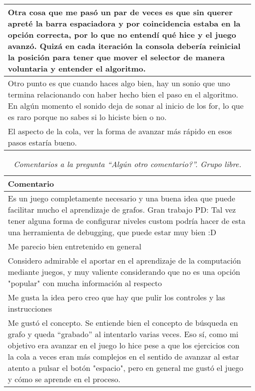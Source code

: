 \begin{table}[h]
\begin{tabular}{|p{\linewidth}|}
   Otra cosa que me pasó un par de veces es que sin querer apreté la barra espaciadora y por coincidencia estaba en la opción correcta, por lo que no entendí qué hice y el juego avanzó. Quizá en cada iteración la consola debería reinicial la posición para tener que mover el selector de manera voluntaria y entender el algoritmo. \\\hline
   
   Otro punto es que cuando haces algo bien, hay un sonio que uno termina relacionando con haber hecho bien el paso en el algoritmo. En algún momento el sonido deja de sonar al inicio de los for, lo que es raro porque no sabes si lo hiciste bien o no. \\\hline

   El aspecto de la cola, ver la forma de avanzar más rápido en esos pasos estaría bueno. \\
   \hline
   \end{tabular}
\end{table}

\restoregeometry



\begin{table}[h]
   \centering
   \caption*{\textit{Comentarios a la pregunta ``Algún otro comentario?''. Grupo libre.}}
   \begin{tabular}{|p{\linewidth}|}
   \hline %
   \textbf{Comentario} \\\hline
   Es un juego completamente necesario y una buena idea que puede facilitar mucho el aprendizaje de grafos. Gran trabajo
   PD: Tal vez tener alguna forma de configurar niveles custom podría hacer de esta una herramienta de debugging, que puede estar muy bien :D \\\hline
   Me parecio bien entretenido en general \\\hline
   
   Considero admirable el aportar en el aprendizaje de la computación mediante juegos, y muy valiente considerando que no es una opción "popular" con mucha información al respecto \\\hline
   Me gusta la idea pero creo que hay que pulir los controles y las instrucciones \\\hline
   Me gustó el concepto. Se entiende bien el concepto de búsqueda en grafo y queda ``grabado'' al intentarlo varias veces. Eso sí, como mi objetivo era avanzar en el juego lo hice pese a que los ejercicios con la cola a veces eran más complejos en el sentido de avanzar al estar atento a pulsar el botón "espacio", pero en general me gustó el juego y cómo se aprende en el proceso.
   \\\hline
   \end{tabular}
\end{table}

\restoregeometry

